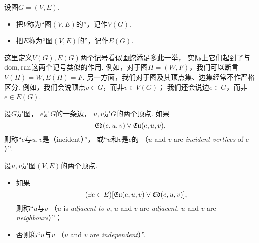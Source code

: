 \begin{definition}
设图\(G = (V,E)\).
\begin{itemize}
	\item 把\(V\)称为“图\((V,E)\)的”，记作\(V(G)\).
	\item 把\(E\)称为“图\((V,E)\)的”，记作\(E(G)\).
\end{itemize}
\end{definition}
\begin{remark}
这里定义\(V(G),E(G)\)两个记号看似画蛇添足多此一举，
实际上它们起到了与\(\operatorname{dom},\operatorname{ran}\)这两个记号类似的作用.
例如，对于图\(H = (W,F)\)，我们可以断言\(V(H) = W,E(H) = F\).
另一方面，我们对于图及其顶点集、边集经常不作严格区分.
例如，我们会说顶点\(v \in G\)，而非\(v \in V(G)\)；
我们还会说边\(e \in G\)，而非\(e \in E(G)\).
\end{remark}

\begin{definition}
设\(G\)是图，
\(e\)是\(G\)的一条边，
\(u,v\)是\(G\)的两个顶点.
如果\begin{equation*}
	\mathfrak{Ed}(e,u,v)
	\lor
	\mathfrak{Eu}(e,u,v),
\end{equation*}
则称“\(e\)与\(u,v\)是（incident）”，
或“\(u\)和\(v\)是\(e\)的%
（\(u\) and \(v\) are \emph{incident vertices} of \(e\)）”.
\end{definition}

\begin{definition}
设\(u,v\)是图\((V,E)\)的两个顶点.
\begin{itemize}
	\item 如果\begin{equation*}
		(\exists e \in E)
		[
			\mathfrak{Eu}(e,u,v)
			\lor
			\mathfrak{Ed}(e,u,v)
		],
	\end{equation*}
	则称“\(u\)与\(v\) %
	（\(u\) is \emph{adjacent to} \(v\),
	\(u\) and \(v\) are \emph{adjacent},
	\(u\) and \(v\) are \emph{neighbours}）”；

	\item 否则称“\(u\)与\(v\) %
	（\(u\) and \(v\) are \emph{independent}）”.
\end{itemize}
\end{definition}

